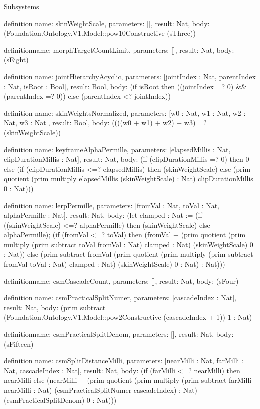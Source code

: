 \begin{lexlean}{Subsystems}
\begin{semanticmodule}
definition{
  name: skinWeightScale,
  parameters: [],
  result: Nat,
  body: (Foundation.Ontology.V1.Model::pow10Constructive (sThree))
}

definition{name: morphTargetCountLimit, parameters: [], result: Nat, body: (sEight)}

definition{
  name: jointHierarchyAcyclic,
  parameters: [jointIndex : Nat, parentIndex : Nat, isRoot : Bool],
  result: Bool,
  body: (if isRoot then ((jointIndex =? 0) && (parentIndex =? 0)) else (parentIndex <? jointIndex))
}

definition{
  name: skinWeightsNormalized,
  parameters: [w0 : Nat, w1 : Nat, w2 : Nat, w3 : Nat],
  result: Bool,
  body: ((((w0 + w1) + w2) + w3) =? (skinWeightScale))
}

definition{
  name: keyframeAlphaPermille,
  parameters: [elapsedMillis : Nat, clipDurationMillis : Nat],
  result: Nat,
  body: (if (clipDurationMillis =? 0) then 0 else (if (clipDurationMillis <=? elapsedMillis) then (skinWeightScale) else (prim quotient (prim multiply elapsedMillis (skinWeightScale) : Nat) clipDurationMillis 0 : Nat)))
}

definition{
  name: lerpPermille,
  parameters: [fromVal : Nat, toVal : Nat, alphaPermille : Nat],
  result: Nat,
  body: (let clamped : Nat := (if ((skinWeightScale) <=? alphaPermille) then (skinWeightScale) else alphaPermille); (if (fromVal <=? toVal) then (fromVal + (prim quotient (prim multiply (prim subtract toVal fromVal : Nat) clamped : Nat) (skinWeightScale) 0 : Nat)) else (prim subtract fromVal (prim quotient (prim multiply (prim subtract fromVal toVal : Nat) clamped : Nat) (skinWeightScale) 0 : Nat) : Nat)))
}

definition{name: csmCascadeCount, parameters: [], result: Nat, body: (sFour)}

definition{
  name: csmPracticalSplitNumer,
  parameters: [cascadeIndex : Nat],
  result: Nat,
  body: (prim subtract (Foundation.Ontology.V1.Model::pow2Constructive (cascadeIndex + 1)) 1 : Nat)
}

definition{name: csmPracticalSplitDenom, parameters: [], result: Nat, body: (sFifteen)}

definition{
  name: csmSplitDistanceMilli,
  parameters: [nearMilli : Nat, farMilli : Nat, cascadeIndex : Nat],
  result: Nat,
  body: (if (farMilli <=? nearMilli) then nearMilli else (nearMilli + (prim quotient (prim multiply (prim subtract farMilli nearMilli : Nat) (csmPracticalSplitNumer cascadeIndex) : Nat) (csmPracticalSplitDenom) 0 : Nat)))
}


\end{semanticmodule}
\end{lexlean}
